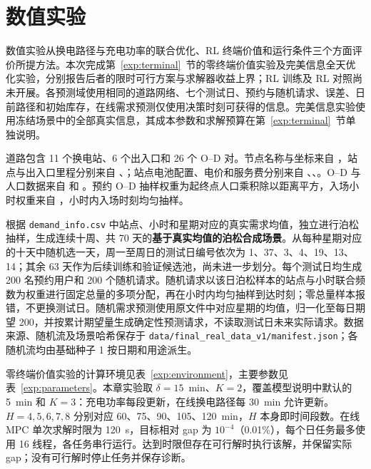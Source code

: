 \section{数值实验}
\label{exp:section}

数值实验从换电路径与充电功率的联合优化、RL 终端价值和运行条件三个方面评价所提方法。本次完成第~\ref{exp:terminal}~节的零终端价值实验及完美信息全天优化实验，分别报告后者的限时可行方案与求解器收益上界；RL 训练及 RL 对照尚未开展。各预测域使用相同的道路网络、七个测试日、预约与随机请求、误差、日前路径和初始库存，在线需求预测仅使用决策时刻可获得的信息。完美信息实验使用冻结场景中的全部真实信息，其成本参数和求解预算在第~\ref{exp:terminal}~节单独说明。

道路包含 11 个换电站、6 个出入口和 26 个 O--D 对。节点名称与坐标来自 ，站点与出入口里程分别来自 、；站点电池配置、电价和服务费分别来自 、、。O--D 与人口数据来自  和 。预约 O--D 抽样权重为起终点人口乘积除以距离平方，入场小时权重来自 ，小时内入场时刻均匀抽样。

根据 \texttt{demand\_info.csv} 中站点、小时和星期对应的真实需求均值，独立进行泊松抽样，生成连续十周、共 70 天的\textbf{基于真实均值的泊松合成场景}。从每种星期对应的十天中随机选一天，周一至周日的测试日编号依次为 1、37、3、4、19、13、14；其余 63 天作为后续训练和验证候选池，尚未进一步划分。每个测试日均生成 200 名预约用户和 200 个随机请求。随机请求以该日泊松样本的站点与小时联合频数为权重进行固定总量的多项分配，再在小时内均匀抽样到达时刻；零总量样本报错，不更换测试日。随机需求预测使用原文件中对应星期的均值，归一化至每日期望 200，并按累计期望量生成确定性预测请求，不读取测试日未来实际请求。数据来源、随机流及场景哈希保存于 \texttt{data/final\_real\_data\_v1/manifest.json}；各随机流均由基础种子 1 按日期和用途派生。

零终端价值实验的计算环境见表~\ref{exp:environment}，主要参数见表~\ref{exp:parameters}。本章实验取 $\delta=15$~min、$K=2$，覆盖模型说明中默认的 5~min 和 $K=3$：充电功率每段更新，在线换电路径每 30~min 允许更新。$H=4,5,6,7,8$ 分别对应 60、75、90、105、120~min，$H$ 本身即时间段数。在线 MPC 单次求解时限为 120~s，目标相对 gap 为 $10^{-4}$（0.01\%），每个日任务最多使用 16 线程，各任务串行运行。达到时限但存在可行解时执行该解，并保留实际 gap；没有可行解时停止任务并保存诊断。

